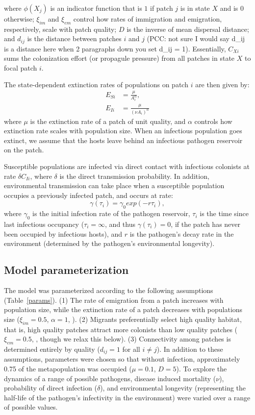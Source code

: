 \documentclass{article}
\begin{document}
where $\phi(X_j)$ is an indicator function that is $1$ if patch $j$ is in state $X$ and is $0$ otherwise; $\xi_{im}$ and $\xi_{em}$ control how rates of immigration and emigration, respectively, scale with patch quality; $D$ is the inverse of mean dispersal distance; and $d_{ij}$ is the distance between patches $i$ and $j$  (PCC: not sure I would say d_ij is a distance here when 2 paragraphs down you set d_ij = 1).  Essentially, $C_{Xi}$ sums the colonization effort (or propagule pressure) from all patches in state $X$ to focal patch $i$.  

The state-dependent extinction rates of populations on patch $i$ are then given by:
\begin{align}
E_{Si} & =\frac{\mu}{A_i^\alpha},\\
E_{Ii} & = \frac{\mu}{(\nu A_i) ^ \alpha}
\end{align}
where $\mu$ is the extinction rate of a patch of unit quality, and $\alpha$ controls how extinction rate scales with population size.  When an infectious population goes extinct, we assume that the hosts leave behind an infectious pathogen reservoir on the patch.  

Susceptible populations are infected via direct contact with infectious colonists at rate $\delta C_{Ii}$, where $\delta$ is the direct transmission probability.  In addition, environmental transmission can take place when a susceptible population occupies a previously infected patch, and occurs at rate:
\begin{equation}
\gamma(\tau_i)=\gamma_0exp(-r\tau_{i}),
\end{equation}
where $\gamma_0$ is the initial infection rate of the pathogen reservoir, $\tau_{i}$ is the time since last infectious occupancy ($\tau_{i} = \infty$, and thus $\gamma(\tau_i) = 0$, if the patch has never been occupied by infectious hosts), and $r$ is the pathogen's decay rate in the environment (determined by the pathogen's environmental longevity).

\subsection{Model parameterization}

The model was parameterized  according to the following assumptions (Table~\ref{params}). (1) The rate of emigration from a patch increases with population size, while the extinction rate of a patch decreases with populations size ($\xi_{im}=0.5$, $\alpha=1$, \cite{Hanski2003}).  (2) Migrants preferentially select high quality habitat, that is, high quality patches attract more colonists than low quality patches ($\xi_{em}=0.5$, \cite{Hanski2003}, though we relax this below).  (3)  Connectivity among patches is determined entirely by quality ($d_{ij}=1$ for all $i \neq j$).  In addition to these assumptions, parameters were chosen so that without infection, approximately 0.75 of the metapopulation was occupied ($\mu = 0.1$, $D=5$).  To explore the dynamics of a range of possible pathogens, disease induced mortality ($\nu$), probability of direct infection ($\delta$), and environmental longevity (representing the half-life of the pathogen's infectivity in the environment) were varied over a range of possible values.
\end{document}
